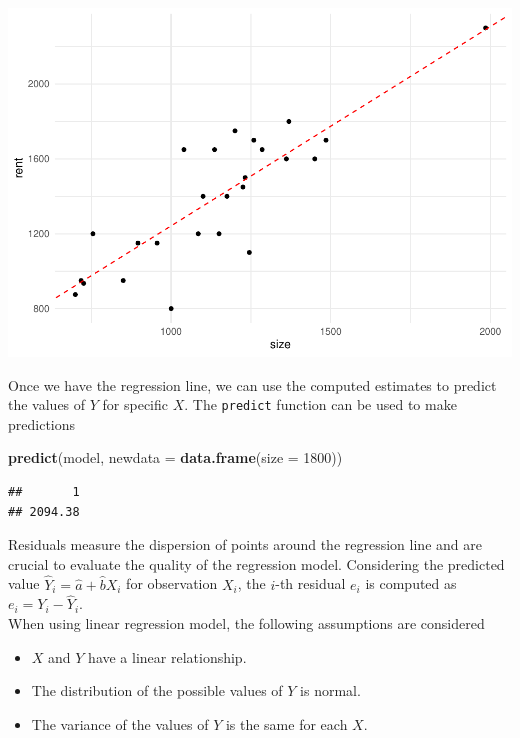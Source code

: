 \documentclass[
]{article}
\newenvironment{Shaded}{\begin{snugshade}}{\end{snugshade}}
\newcommand{\AttributeTok}[1]{\textcolor[rgb]{0.13,0.29,0.53}{#1}}
\newcommand{\DecValTok}[1]{\textcolor[rgb]{0.00,0.00,0.81}{#1}}
\newcommand{\FunctionTok}[1]{\textcolor[rgb]{0.13,0.29,0.53}{\textbf{#1}}}
\newcommand{\NormalTok}[1]{#1}
\providecommand{\tightlist}{%
  \setlength{\itemsep}{0pt}\setlength{\parskip}{0pt}}
\begin{document}
\includegraphics{Tests_and_Applications_files/figure-latex/unnamed-chunk-40-1.pdf}

Once we have the regression line, we can use the computed estimates to
predict the values of \(Y\) for specific \(X\). The \texttt{predict}
function can be used to make predictions

\begin{Shaded}
\begin{Highlighting}[]
\FunctionTok{predict}\NormalTok{(model, }\AttributeTok{newdata =} \FunctionTok{data.frame}\NormalTok{(}\AttributeTok{size =} \DecValTok{1800}\NormalTok{))}
\end{Highlighting}
\end{Shaded}

\begin{verbatim}
##       1 
## 2094.38
\end{verbatim}

Residuals measure the dispersion of points around the regression line
and are crucial to evaluate the quality of the regression model.
Considering the predicted value \(\hat{Y}_i = \hat{a} + \hat{b} X_i\)
for observation \(X_i\), the \(i\)-th residual \(e_i\) is computed as
\(e_i = Y_i- \hat{Y}_i\).\\
When using linear regression model, the following assumptions are
considered

\begin{itemize}
\tightlist
\item
  \(X\) and \(Y\) have a linear relationship.
\item
  The distribution of the possible values of \(Y\) is normal.
\item
  The variance of the values of \(Y\) is the same for each \(X\).
\end{itemize}
\end{document}
